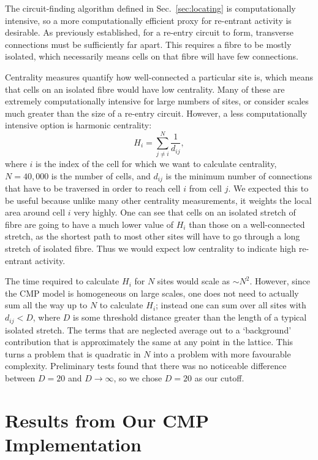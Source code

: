 The circuit-finding algorithm defined in Sec.~\ref{sec:locating} is computationally intensive, so a more computationally efficient proxy for re-entrant activity is desirable.
As previously established, for a re-entry circuit to form, transverse connections must be sufficiently far apart. This requires a fibre to be mostly isolated, which necessarily means cells on that fibre will have few connections. 

Centrality measures quantify how well-connected a particular site is, which means that cells on an isolated fibre would have low centrality. Many of these are extremely computationally intensive for large numbers of sites, or consider scales much greater than the size of a re-entry circuit.
However, a less computationally intensive option is harmonic centrality:
\begin{equation}
    H_i = \sum_{j \ne i}^N \frac{1}{d_{ij}}, \label{eq:harmonic}
\end{equation}
where $i$ is the index of the cell for which we want to calculate centrality, $N=40,000$ is the number of cells, and $d_{ij}$ is the minimum number of connections that have to be traversed in order to reach cell $i$ from cell $j$. We expected this to be useful because unlike many other centrality measurements, it weights the local area around cell $i$ very highly. One can see that cells on an isolated stretch of fibre are going to have a much lower value of $H_i$ than those on a well-connected stretch, as the shortest path to most other sites will have to go through a long stretch of isolated fibre. Thus we would expect low centrality to indicate high re-entrant activity.

The time required to calculate $H_i$ for $N$ sites would scale as $\sim N^2$. However, since the CMP model is homogeneous on large scales, one does not need to actually sum all the way up to $N$ to calculate $H_i$; instead one can sum over all sites with $d_{ij} < D$, where $D$ is some threshold distance greater than the length of a typical isolated stretch. The terms that are neglected average out to a `background' contribution that is approximately the same at any point in the lattice. This turns a problem that is quadratic in $N$ into a problem with more favourable complexity. Preliminary tests found that there was no noticeable difference between $D=20$ and $D\rightarrow\infty$, so we chose $D=20$ as our cutoff.

\section{Results from Our CMP Implementation}

